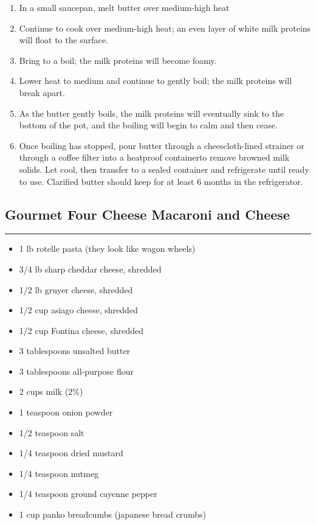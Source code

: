 \documentclass{article}
\begin{document}
\begin{enumerate}
    \item 
        In a small saucepan, melt butter over medium-high heat
    \item 
        Continue to cook over medium-high heat; an even layer of white milk proteins will float to the surface.
    \item 
        Bring to a boil; the milk proteins will become foamy.
    \item 
        Lower heat to medium and continue to gently boil; the milk proteins will break apart.
    \item 
        As the butter gently boils, the milk proteins will eventually sink to the bottom of the pot, and the boiling will begin to calm and then cease.
    \item 
        Once boiling has stopped, pour butter through a cheescloth-lined strainer or through a coffee filter into a heatproof containerto remove browned milk solids. Let cool, then transfer to a sealed container and refrigerate until ready to use. Clarified butter should keep for at least 6 months in the refrigerator.
\end{enumerate}
\newpage 


\subsection{Gourmet Four Cheese Macaroni and Cheese} 
\noindent\rule[0.5ex]{\linewidth}{1pt}

\begin{framed}
    \begin{itemize}
        \item 1 lb rotelle pasta (they look like wagon wheels)
        \item 3/4 lb sharp cheddar cheese, shredded
        \item 1/2 lb gruyer cheese, shredded
        \item 1/2 cup asiago cheese, shredded
        \item 1/2 cup Fontina cheese, shredded
        \item 3 tablespoons unsalted butter
        \item 3 tablespoons all-purpose flour
        \item 2 cups milk (2\%)
        \item 1 teaspoon onion powder
        \item 1/2 teaspoon salt
        \item 1/4 teaspoon dried mustard
        \item 1/4 teaspoon nutmeg
        \item 1/4 teaspoon ground cayenne pepper
        \item 1 cup panko breadcumbs (japanese bread crumbs)
    \end{itemize}
\end{framed}
\end{document}
